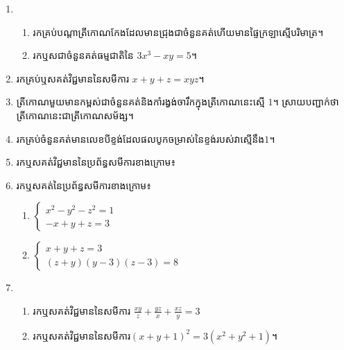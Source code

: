 \documentclass[a4paper,12pt]{book}
\begin{document}
\begin{enumerate}[1]
\begin{enumerate}[a]
\end{enumerate}
\item
\begin{enumerate}[a]
\item រកគ្រប់បណ្តាត្រីកោណកែងដែលមានជ្រុងជាចំនួនគត់ហើយមានផ្ទៃក្រឡាស្មើបរិមាត្រ។
\item រកឬសជាចំនួនគត់ធម្មជាតិនៃ $3x^3-xy=5$។
\end{enumerate}
\item រកគ្រប់ឬសគត់វិជ្ជមាននៃសមីការ $x+y+z=xyz$។
\item ត្រីកោណមួយមានកម្ពស់ជាចំនួនគត់និងកាំរង្វង់ចារឹកក្នុងត្រីកោណនេះស្មើ $1$​ ។ ស្រាយបញ្ជាក់ថាត្រីកោណនេះជាត្រីកោណសម័ង្ស។
\item រកគ្រប់ចំនួនគត់មានលេខបីខ្ទង់ដែលផលបូកចម្រាស់នៃខ្ទង់របស់វាស្មើនឹង​$1$។
\item រកឬសគត់វិជ្ជមាននៃប្រព័ន្ធសមីការខាងក្រោម៖
\begin{enumerate}[a]
\end{enumerate}
\item រកឬសគត់នៃប្រព័ន្ធសមីការខាងក្រោម៖
\begin{multicols}{2}
\begin{enumerate}[a]
\item $\begin{cases}x^2-y^2-z^2=1\\-x+y+z=3\end{cases}$
\item $\begin{cases}x+y+z=3\\(z+y)(y-3)(z-3)=8\end{cases}$
\end{enumerate}
\end{multicols}
\item 
\begin{enumerate}[a]
\item រកឬសគត់វិជ្ជមាននៃសមីការ $\frac{xy}{z}+\frac{yz}{x}+\frac{xz}{y}=3$
\item រកឬសគត់វិជ្ជមាននៃសមីការ​ $\left(x+y+1\right)^2=3\left(x^2+y^2+1\right)$​។

\end{enumerate}
\end{enumerate}
\end{document}
